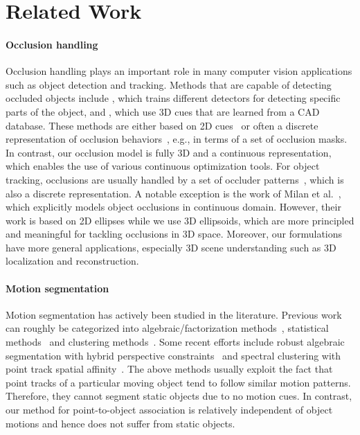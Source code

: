 \section{Related Work}
\label{sec:related}

\paragraph{Occlusion handling} 
Occlusion handling plays an important role in many computer vision applications such as object detection and tracking. Methods that are capable of detecting occluded objects include \cite{Gao_etal_2011}, which trains different detectors for detecting specific parts of the object, and \cite{Pepik_etal_2013,Xiang_Savarese_2013}, which use 3D cues that are learned from a CAD database. These methods are either based on 2D cues~\cite{Gao_etal_2011} or often a discrete representation of occlusion behaviors~\cite{Pepik_etal_2013,Xiang_Savarese_2013}, e.g., in terms of a set of occlusion masks. In contrast, our occlusion model is fully 3D and a continuous representation, which enables the use of various continuous optimization tools. For object tracking, occlusions are usually handled by a set of occluder patterns~\cite{Kwak_etal_2012,Wu_Nevatia_2007}, which is also a discrete representation. A notable exception is the work of Milan et al.~\cite{Milan_etal_2014}, which explicitly models object occlusions in continuous domain. However, their work is based on 2D ellipses while we use 3D ellipsoids, which are more principled and meaningful for tackling occlusions in 3D space. Moreover, our formulations have more general applications, especially 3D scene understanding such as 3D localization and reconstruction.

\paragraph{Motion segmentation}
Motion segmentation has actively been studied in the literature. Previous work can roughly be categorized into algebraic/factorization methods~\cite{Costeria98,Vidal03,Vidal04}, statistical methods~\cite{Kanatani01,Gruber04,Rao08} and clustering methods~\cite{Yan06,Goh07}. Some recent efforts include robust algebraic segmentation with hybrid perspective constraints~\cite{Rao_etal_2010} and spectral clustering with point track spatial affinity~\cite{Brox_Malik_2010}. The above methods usually exploit the fact that point tracks of a particular moving object tend to follow similar motion patterns. Therefore, they cannot segment static objects due to no motion cues. In contrast, our method for point-to-object association is relatively independent of object motions and hence does not suffer from static objects. 

